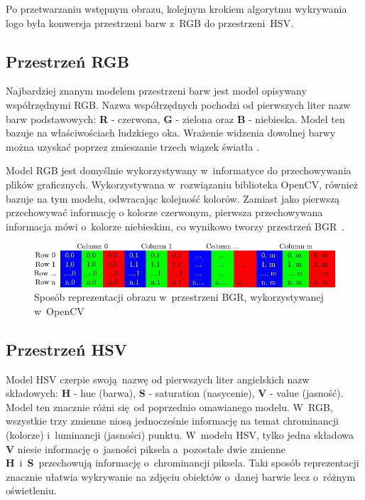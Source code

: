 Po przetwarzaniu wstępnym obrazu, kolejnym krokiem algorytmu wykrywania logo \bk była konwersja przestrzeni barw z~RGB do przestrzeni~HSV.

\subsection{Przestrzeń RGB}
Najbardziej znanym modelem przestrzeni barw jest model opisywany współrzędnymi RGB. Nazwa współrzędnych pochodzi od pierwszych liter nazw barw podstawowych: \textbf{R} - czerwona, \textbf{G} - zielona oraz \textbf{B} - niebieska. Model ten bazuje na właściwościach ludzkiego oka. Wrażenie widzenia dowolnej barwy można uzyskać poprzez zmieszanie trzech wiązek światła \cite{jankowski1990elementy}.

Model RGB jest domyślnie wykorzystywany w~informatyce do przechowywania plików graficznych. Wykorzystywana w~rozwiązaniu biblioteka OpenCV, również bazuje na tym modelu, odwracając kolejność kolorów. Zamiast jako pierwszą przechowywać informację o kolorze czerwonym, pierwsza przechowywana informacja mówi o~kolorze niebieskim, co wynikowo tworzy przestrzeń BGR~\cite{opencv}.

\begin{figure}[h]
    \centering
    \includegraphics[width=\columnwidth]{./figures/opencv-matrix-bgr.png}
    \caption{Sposób reprezentacji obrazu w~przestrzeni BGR, wykorzystywanej w~OpenCV~\cite{opencv}}
    \label{}
\end{figure}

\subsection{Przestrzeń HSV}
Model HSV czerpie swoją nazwę od pierwszych liter angielskich nazw składowych: \textbf{H} - hue (barwa), \textbf{S} - saturation (nasycenie), \textbf{V} - value (jasność). Model ten znacznie różni się od poprzednio omawianego modelu. W~RGB, wszystkie trzy zmienne niosą jednocześnie informację na temat chrominancji (kolorze) i~luminancji (jasności) punktu. W~modelu HSV, tylko jedna składowa \textbf{V} niesie informację o~jasności piksela a~pozostałe dwie zmienne \textbf{H}~i~\textbf{S}~przechowują informację o~chrominancji piksela. Taki sposób reprezentacji znacznie ułatwia wykrywanie na zdjęciu obiektów o~danej barwie lecz o~różnym oświetleniu.

